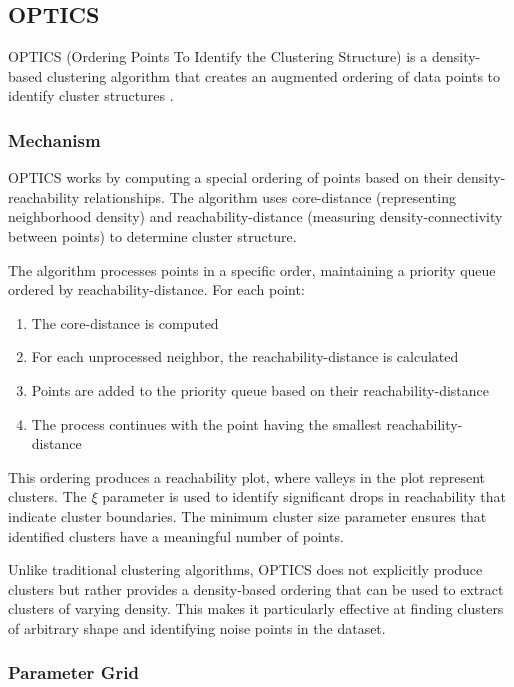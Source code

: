 \subsection{OPTICS}
\label{subsec:methods-optics}

OPTICS (Ordering Points To Identify the Clustering Structure) is a density-based clustering algorithm that creates an augmented ordering of data points to identify cluster structures \cite{1999-optics}.

\subsubsection{Mechanism}

OPTICS works by computing a special ordering of points based on their density-reachability relationships. The algorithm uses core-distance (representing neighborhood density) and reachability-distance (measuring density-connectivity between points) to determine cluster structure.

The algorithm processes points in a specific order, maintaining a priority queue ordered by reachability-distance. For each point:
\begin{enumerate}
    \item The core-distance is computed
    \item For each unprocessed neighbor, the reachability-distance is calculated
    \item Points are added to the priority queue based on their reachability-distance
    \item The process continues with the point having the smallest reachability-distance
\end{enumerate}

This ordering produces a reachability plot, where valleys in the plot represent clusters. The \(\xi\) parameter is used to identify significant drops in reachability that indicate cluster boundaries. The minimum cluster size parameter ensures that identified clusters have a meaningful number of points.

Unlike traditional clustering algorithms, OPTICS does not explicitly produce clusters but rather provides a density-based ordering that can be used to extract clusters of varying density. This makes it particularly effective at finding clusters of arbitrary shape and identifying noise points in the dataset.

\subsubsection{Parameter Grid}

